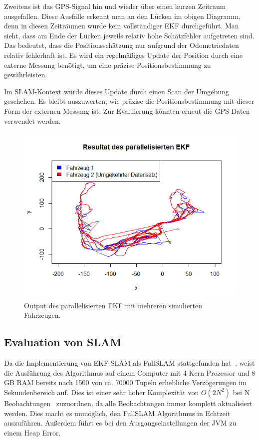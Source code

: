 \documentclass[11pt]{article}
\begin{document}
Zweitens ist das GPS-Signal hin und wieder über einen kurzen Zeitraum ausgefallen. Diese Ausfälle erkennt man an den Lücken im obigen Diagramm, denn in diesen Zeiträumen wurde kein vollständiger EKF durchgeführt. Man sieht, dass am Ende der Lücken jeweils relativ hohe Schätzfehler aufgetreten sind. Das bedeutet, dass die Positionsschätzung nur aufgrund der Odometriedaten relativ fehlerhaft ist. Es wird ein regelmäßiges Update der Position durch eine externe Messung benötigt, um eine präzise Positionsbestimmung zu gewährleisten.

Im SLAM-Kontext würde dieses Update durch einen Scan der Umgebung geschehen. Es bleibt auszuwerten, wie präzise die Positionsbestimmung mit dieser Form der externen Messung ist. Zur Evaluierung könnten erneut die GPS Daten verwendet werden.

\begin{figure}[!t]
	\centering
	\includegraphics[width=5.5in]{EKF-output-parallel.png}
	\caption{Output des parallelisierten EKF mit mehreren simulierten Fahrzeugen.}
	\label{EKF-Output-Parallel}
\end{figure}

\subsection{Evaluation von SLAM}\label{SLAM-Evaluation}
Da die Implementierung von EKF-SLAM als FullSLAM stattgefunden hat~\cite{Freiburg_SLAM_Formeln}, weist die Ausführung des Algorithmus auf einem Computer mit 4 Kern Prozessor und 8 GB RAM bereits nach 1500 von ca. 70000 Tupeln erhebliche Verzögerungen im Sekundenbereich auf. Dies ist einer sehr hoher Komplexität von $O(2N^2)$ bei N Beobachtungen~\cite{ute_SLAM} zuzuordnen, da alle Beobachtungen immer komplett aktualisiert werden. Dies macht es unmöglich, den FullSLAM Algorithmus in Echtzeit auszuführen. Außerdem führt es bei den Ausgangseinstellungen der JVM zu einem Heap Error.
\end{document}
